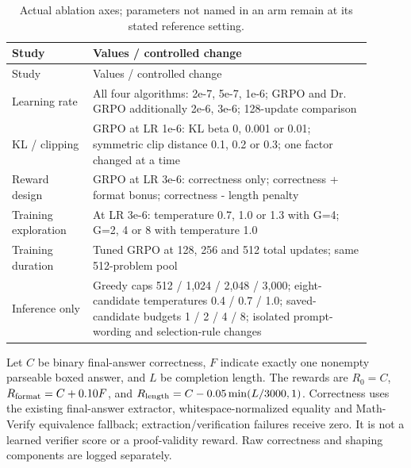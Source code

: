 \documentclass[10pt,letterpaper]{article}
\begin{document}
\begingroup\footnotesize\setlength{\tabcolsep}{3pt}
\begin{longtable}{>{\raggedright\arraybackslash}p{0.2070\linewidth}>{\raggedright\arraybackslash}p{0.6930\linewidth}}
\caption{Actual ablation axes; parameters not named in an arm remain at its stated reference setting.}\\
\toprule Study & Values /\allowbreak{} controlled change \\
\midrule\endfirsthead
\toprule Study & Values /\allowbreak{} controlled change \\
\midrule\endhead
\midrule\multicolumn{2}{r}{Continued on next page}\endfoot
\bottomrule\endlastfoot
Learning rate & All four algorithms: 2e-7, 5e-7, 1e-6; GRPO and Dr. GRPO additionally 2e-6, 3e-6; 128-update comparison \\
KL /\allowbreak{} clipping & GRPO at LR 1e-6: KL beta 0, 0.001 or 0.01; symmetric clip distance 0.1, 0.2 or 0.3; one factor changed at a time \\
Reward design & GRPO at LR 3e-6: correctness only; correctness + format bonus; correctness - length penalty \\
Training exploration & At LR 3e-6: temperature 0.7, 1.0 or 1.3 with G=4; G=2, 4 or 8 with temperature 1.0 \\
Training duration & Tuned GRPO at 128, 256 and 512 total updates; same 512-problem pool \\
Inference only & Greedy caps 512 /\allowbreak{} 1,024 /\allowbreak{} 2,048 /\allowbreak{} 3,000; eight-candidate temperatures 0.4 /\allowbreak{} 0.7 /\allowbreak{} 1.0; saved-candidate budgets 1 /\allowbreak{} 2 /\allowbreak{} 4 /\allowbreak{} 8; isolated prompt-wording and selection-rule changes \\
\end{longtable}\endgroup


Let $C$ be binary final-answer correctness, $F$ indicate exactly one nonempty parseable boxed answer, and $L$ be completion length. The rewards are $R_0=C$, $R_{\rm format}=C+0.10F$, and $R_{\rm length}=C-0.05\min(L/3000,1)$. Correctness uses the existing final-answer extractor, whitespace-normalized equality and Math-Verify equivalence fallback; extraction/verification failures receive zero. It is not a learned verifier score or a proof-validity reward. Raw correctness and shaping components are logged separately.
\end{document}
